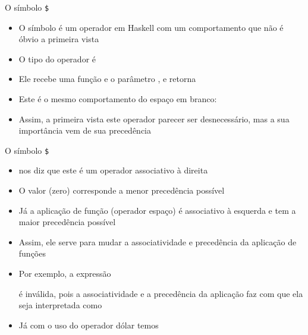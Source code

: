 \begin{frame}[fragile]{O símbolo {\tt \$}} 

    \begin{itemize}
        \item O símbolo   é um operador em Haskell com um comportamento
            que não é óbvio a primeira vista

        \item O tipo do operador  é


        \item Ele recebe uma função  e o parâmetro ,
            e retorna 

        \item Este é o mesmo comportamento do espaço em branco:


        \item Assim, a primeira vista este operador parecer ser desnecessário, mas a sua
            importância vem de sua precedência

    \end{itemize}

\end{frame}

\begin{frame}[fragile]{O símbolo {\tt \$}} 

    \begin{itemize}
        \item {} nos diz que este é um operador associativo à direita

        \item O valor  (zero) corresponde a menor precedência possível

        \item Já a aplicação de função (operador espaço) é associativo à esquerda e tem a
            maior precedência possível

        \item Assim, ele serve para mudar a associatividade e precedência da aplicação de funções

        \item Por exemplo, a expressão


        é inválida, pois a associatividade e a precedência da aplicação faz com que ela seja
         interpretada como


        \item Já com o uso do operador dólar temos

    \end{itemize}

\end{frame}

